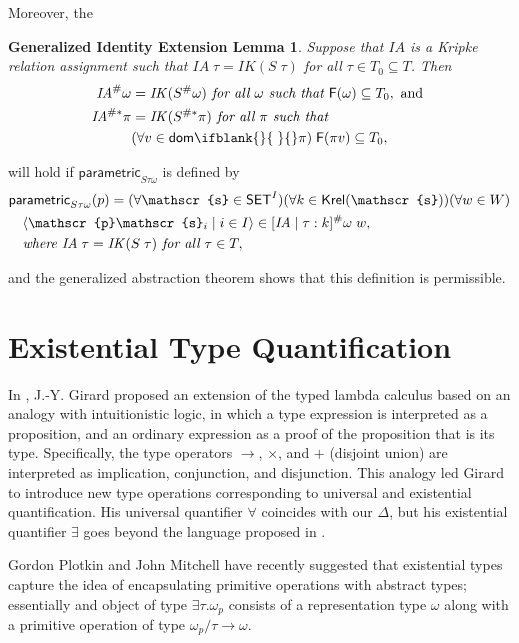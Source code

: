 \documentclass[sigplan,screen,nonacm,balance=false]{acmart}
\theoremstyle{plain}
\DeclarePairedDelimiter{\pair}{\langle}{\rangle}
\newcommand{\dom}[1]{\mathsf{dom}\ifblank{#1}{\;}{#1}}
\newcommand{\FV}{\mathsf{F}}
\newcommand{\IA}{\mathit{IA}}
\newcommand{\IK}{\mathit{IK}}
\newcommand{\SET}{\mathsf{SET}}
\newcommand{\para}{\mathsf{parametric}}
\newcommand{\Krel}{\mathsf{Krel}}
\newcommand{\scrs}{\mathscr{s}}
\newcommand{\scrp}{\mathscr{p}}
\begin{document}
Moreover, the

\newtheorem*{genIEL}{Generalized Identity Extension Lemma}
\begin{genIEL}
  Suppose that $\IA$ is a Kripke relation assignment such that $\IA \; \tau = \IK(S \; \tau)$ for all $\tau \in T_0 \subseteq T$.
  Then
  \begin{align*}
    \IA^\# \omega &= \IK(S^\# \omega) \textit{ for all } \omega \textit{ such that } \FV(\omega) \subseteq T_0, \text{ and } \\
    \IA^{\#*} \pi &= \IK(S^{\#*} \pi) \textit{ for all } \pi \textit{ such that } \\
    & (\forall v \in \dom{} \pi) \; \FV(\pi v) \subseteq T_0,
  \end{align*}
\end{genIEL}

will hold if $\para_{S \tau \omega}$ is defined by
%
\begin{align*}
  & \para_{S \tau \omega}(p) =
  (\forall \scrs \in \SET^I) (\forall k \in \Krel(\scrs)) (\forall w \in W) \\
  & \quad \pair{\scrp \scrs_i \mid i \in I} \in [\IA \mid \tau: k]^\# \omega \; w, \\
  & \quad \textit{where } \IA \; \tau = \IK(S \; \tau) \textit{ for all } \tau \in T,
\end{align*}

and the generalized abstraction theorem shows that this definition is permissible.

\section{Existential Type Quantification}

In \citep{SystemF}, J.-Y. Girard proposed an extension of the typed lambda calculus based on an analogy with intuitionistic logic, in which a type expression is interpreted as a proposition, and an ordinary expression as a proof of the proposition that is its type.
Specifically, the type operators $\to$, $\times$, and $+$ (disjoint union) are interpreted as implication, conjunction, and disjunction.
This analogy led Girard to introduce new type operations corresponding to universal and existential quantification.
His universal quantifier $\forall$ coincides with our $\Delta$, but his existential quantifier $\exists$ goes beyond the language proposed in \citep{polymorphism}.

Gordon Plotkin and John Mitchell have recently suggested that existential types capture the idea of encapsulating primitive operations with abstract types; essentially and object of type $\exists \tau. \omega_p$ consists of a representation type $\omega$ along with a primitive operation of type $\omega_p/\tau \to \omega$.
\end{document}
